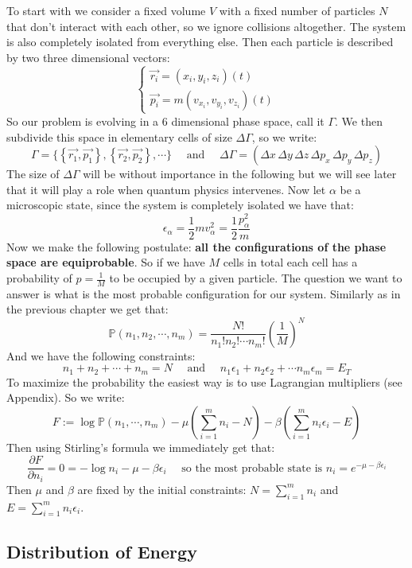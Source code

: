 \documentclass[10pt,a4paper]{book}
\begin{document}
To start with we consider a fixed volume $V$ with a fixed number of particles $N$ that don't interact with each other, so we ignore collisions altogether. The system is also completely isolated from everything else.
Then each particle is described by two three dimensional vectors:
\[
\begin{cases}
\overrightarrow{r_i} = (x_i, y_i, z_i)(t)\\
\overrightarrow{p_i} = m(v_{x_i}, v_{y_i}, v_{z_i})(t)
\end{cases}
\]
So our problem is evolving in a $6$ dimensional phase space, call it $\Gamma$. We then subdivide this space in elementary cells of size $\Delta \Gamma$, so we write:
\[
\Gamma = \Big\{\left\{\overrightarrow{r_1}, \overrightarrow{p_1}\right\}, \left\{\overrightarrow{r_2}, \overrightarrow{p_2}\right\}, \cdots \Big\} \quad \text{ and } \quad \Delta \Gamma = (\Delta x \, \Delta y\, \Delta z\, \Delta p_x\, \Delta p_y\, \Delta p_z)
\]
The size of $\Delta \Gamma$ will be without importance in the following but we will see later that it will play a role when quantum physics intervenes. Now let $\alpha$ be a microscopic state, since the system is completely isolated we have that:
\[
\epsilon_\alpha = \frac{1}{2}mv_\alpha^2 = \frac{1}{2}\frac{p_\alpha^2}{m}
\]
Now we make the following postulate: \textbf{all the configurations of the phase space are equiprobable}. So if we have $M$ cells in total each cell has a probability of $p = \frac{1}{M}$ to be occupied by a given particle. The question we want to answer is what is the most probable configuration for our system. Similarly as in the previous chapter we get that:
\[
\mathbb{P}(n_1, n_2, \cdots, n_m) = \frac{N!}{n_1!n_2!\cdots n_m!}\left(\frac{1}{M}\right)^N
\]
And we have the following constraints:
\[
n_1 + n_2 + \cdots + n_m = N \quad \text{ and } \quad n_1\epsilon_1 + n_2\epsilon_2 + \cdots n_m \epsilon_m = E_T
\]
To maximize the probability the easiest way is to use Lagrangian multipliers (see Appendix). So we write:
\[
F := \log\mathbb{P}(n_1, \cdots, n_m) - \mu\left(\sum_{i = 1}^m n_i - N\right) - \beta\left(\sum_{i = 1}^m n_i \epsilon_i - E\right)
\]
Then using Stirling's formula we immediately get that:
\[
\frac{\partial F}{\partial n_i} = 0 = -\log n_i - \mu - \beta \epsilon_i \quad \text{ so the most probable state is } n_i = e^{-\mu - \beta\epsilon_i}
\]
Then $\mu$ and $\beta$ are fixed by the initial constraints: $N = \sum_{i = 1}^m n_i$ and $E = \sum_{i = 1}^m n_i\epsilon_i$.
\subsection{Distribution of Energy}
\end{document}
